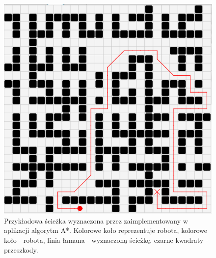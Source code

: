\begin{figure}
	\centering
	\includegraphics[width=0.5\columnwidth]{img/robopath/astar-simple}
	\caption{Przykładowa ścieżka wyznaczona przez zaimplementowany w aplikacji algorytm A*. Kolorowe koło reprezentuje robota, kolorowe koło - robota, linia łamana - wyznaczoną ścieżkę, czarne kwadraty - przeszkody.}
	\label{fig:robopath-astar-simple}
\end{figure}

